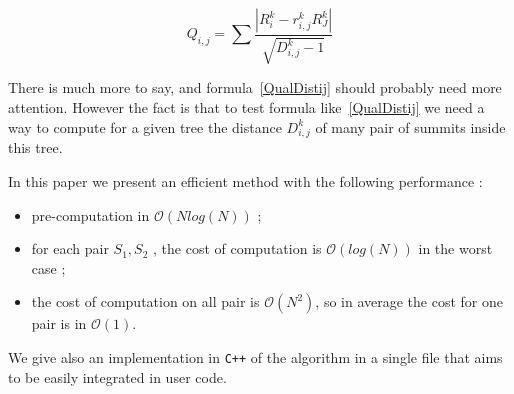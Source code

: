 \documentclass[a4paper]{article}
\begin{document}
\begin{equation}
   Q_{i,j} = \sum \frac{|R^k_i - r^k_{i,j} R^k_J|}{\sqrt{D^k_{i,j}-1}} \label{QualDistij}
\end{equation}

There is much more to say, and formula~\ref{QualDistij} should probably
need more attention.  However the fact is that to test formula like~\ref{QualDistij}
we need a way to compute for a given tree the distance $D^k_{i,j}$ of many pair
of summits inside this tree.

In this paper we present an efficient  method with the following performance :

\begin{itemize}
   \item pre-computation in $\mathcal{O}(N log(N))$ ;
   \item for each pair $S_1,S_2$ , the cost of computation is $\mathcal{O}(log(N))$ in the worst case ;
   \item the cost of computation on all pair is $\mathcal{O}(N^2)$, so in average 
         the cost for one pair is in $\mathcal{O}(1)$.
\end{itemize}

We give also an implementation in {\tt C++} of the algorithm in a single file that aims
to be easily integrated in user code.

\end{document}
